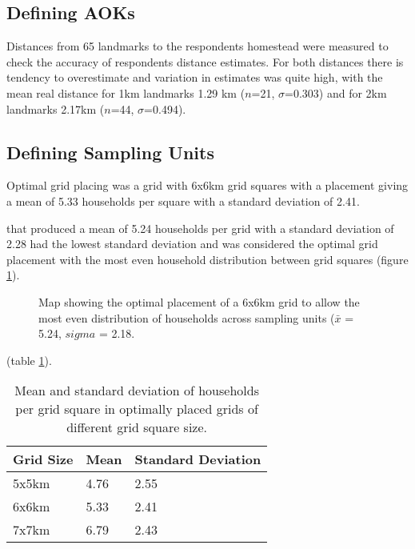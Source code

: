 \subsection{Defining AOKs}
Distances from 65 landmarks to the respondents homestead were measured to check the accuracy of respondents distance estimates. For both distances there is tendency to overestimate and variation in estimates was quite high, with the mean real distance for 1km landmarks 1.29 km ($n$=21, $\sigma$=0.303) and for 2km landmarks 2.17km ($n$=44, $\sigma$=0.494).

\subsection{Defining Sampling Units}

Optimal grid placing was a grid with 6x6km grid squares with a placement giving a mean of 5.33 households per square with a standard deviation of 2.41.

that produced a mean of 5.24 households per grid with a standard deviation of 2.28 had the lowest standard deviation and was considered the optimal grid placement with the most even household distribution between grid squares (figure \ref{fig:6km_grid_place}).

\begin{figure}[h]
\centering
\setlength\fboxsep{0pt}
\setlength\fboxrule{0.5pt}
\caption{Map showing the optimal placement of a 6x6km grid to allow the most even distribution of households across sampling units ($\bar{x}$ = 5.24, $sigma$ = 2.18.}
\label{fig:6km_grid_place}
\end{figure}
 
(table \ref{table:grid_place}).
\begin{table}[htb]
	\small
	\begin{center}
		\begin{tabular}{l l l}
			\hline \hline		
			Grid Size	& Mean 	& Standard Deviation \\ \hline
			5x5km 		& 4.76	& 2.55	\\	
			6x6km		& 5.33	& 2.41	\\
			7x7km		& 6.79	& 2.43	\\
			\hline \hline						
		\end{tabular}
		\caption{Mean and standard deviation of households per grid square in optimally placed grids of different grid square size.}
	\label{table:grid_place}
	\end{center}
\end{table}


